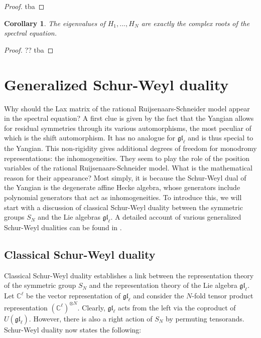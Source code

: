 \documentclass[11pt]{report}
\newtheorem{corollary}[theorem]{Corollary}
\theoremstyle{definition}
\theoremstyle{remark}
\theoremstyle{remark}
\newcommand{\C}{\mathbb{C}}
\begin{document}
\begin{proof}
tba
\end{proof}

\begin{corollary}
The eigenvalues of $H_1,...,H_N$ are exactly the complex roots of the spectral equation.
\end{corollary}

\begin{proof}
?? tba
\end{proof}

\section{Generalized Schur-Weyl duality}

Why should the Lax matrix of the rational Ruijsenaars-Schneider model appear in the spectral equation? A first clue is given by the fact that the Yangian allows for residual symmetries through its various automorphisms, the most peculiar of which is the shift automorphism. It has no analogue for $\mathfrak{gl}_\ell$ and is thus special to the Yangian. This non-rigidity gives additional degrees of freedom for monodromy representations: the inhomogeneities. They seem to play the role of the position variables of the rational Ruijsenaars-Schneider model. What is the mathematical reason for their appearance? Most simply, it is because the Schur-Weyl dual of the Yangian is the degenerate affine Hecke algebra, whose generators include polynomial generators that act as inhomogeneities. To introduce this, we will start with a discussion of classical Schur-Weyl duality between the symmetric groups $S_N$ and the Lie algebras $\mathfrak{gl}_\ell$. A detailed account of various generalized Schur-Weyl dualities can be found in \cite{thesis:antor:2020}.

\subsection{Classical Schur-Weyl duality}

Classical Schur-Weyl duality establishes a link between the representation theory of the symmetric group $S_N$ and the representation theory of the Lie algebra $\mathfrak{gl}_\ell$. Let $\C^\ell$ be the vector representation of $\mathfrak{gl}_\ell$ and consider the $N$-fold tensor product representation $(\C^\ell)^{\otimes N}$. Clearly, $\mathfrak{gl}_\ell$ acts from the left via the coproduct of $U(\mathfrak{gl}_\ell)$. However, there is also a right action of $S_N$ by permuting tensorands. Schur-Weyl duality now states the following:
\end{document}
